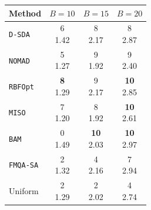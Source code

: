 \begin{tabular}{@{}lccc@{}}\toprule
Method & \(B=10\) & \(B=15\) & \(B=20\)\\\midrule
\texttt{D-SDA} & \makecell{6\\1.42} & \makecell{8\\2.17} & \makecell{8\\2.87} \\
\texttt{NOMAD} & \makecell{5\\1.27} & \makecell{9\\1.92} & \makecell{9\\2.40} \\
\texttt{RBFOpt} & \makecell{\textbf{8}\\1.29} & \makecell{9\\2.17} & \makecell{\textbf{10}\\2.85} \\
\texttt{MISO} & \makecell{7\\1.20} & \makecell{8\\1.92} & \makecell{\textbf{10}\\2.61} \\
\texttt{BAM} & \makecell{0\\1.49} & \makecell{\textbf{10}\\2.03} & \makecell{\textbf{10}\\2.97} \\
\texttt{FMQA-SA} & \makecell{2\\1.32} & \makecell{4\\2.16} & \makecell{7\\2.94} \\
Uniform & \makecell{2\\1.29} & \makecell{2\\2.02} & \makecell{4\\2.74} \\
\bottomrule\end{tabular}
